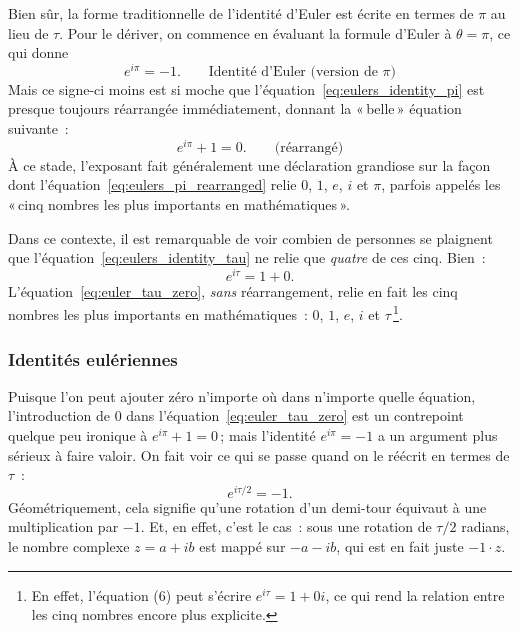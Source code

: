 Bien sûr, la forme traditionnelle de l'identité d'Euler est écrite en termes de $\pi$ au lieu de $\tau$. Pour le dériver, on commence en évaluant la formule d'Euler à $\theta = \pi$, ce qui donne
\begin{equation}
\label{eq:eulers_identity_pi}
e^{i\pi} = -1. \qquad\mbox{Identité d'Euler (version de $\pi$)}
\end{equation}
\noindent Mais ce signe-ci moins est si moche que l'équation~\eqref{eq:eulers_identity_pi} est presque toujours réarrangée immédiatement, donnant la «\,belle\,» équation suivante~:
\begin{equation}
\label{eq:eulers_pi_rearranged}
e^{i\pi} + 1 = 0. \qquad\mbox{(réarrangé)}
\end{equation}
À ce stade, l'exposant fait généralement une déclaration grandiose sur la façon dont l'équation~\eqref{eq:eulers_pi_rearranged} relie $0$, $1$, $e$, $i$ et $\pi$, parfois appelés les «\,cinq nombres les plus importants en mathématiques\,».

Dans ce contexte, il est remarquable de voir combien de personnes se plaignent que l'équation~\eqref{eq:eulers_identity_tau} ne relie que \emph{quatre} de ces cinq. Bien~:
\begin{equation}
\label{eq:euler_tau_zero}
e^{i\tau} = 1 + 0.
\end{equation}
L'équation~\eqref{eq:euler_tau_zero}, \emph{sans} réarrangement, relie en fait les cinq nombres les plus importants en mathématiques~: $0$, $1$, $e$, $i$ et $\tau$\,\footnote{En effet, l'équation (6) peut s'écrire $e^{i\tau} = 1 + 0i$, ce qui rend la relation entre les cinq nombres encore plus explicite.}.

      \subsubsection{Identités eulériennes} %
      \label{sec:eulerian_identities}

Puisque l'on peut ajouter zéro n'importe où dans n'importe quelle équation, l'introduction de $0$ dans l'équation~\eqref{eq:euler_tau_zero} est un contrepoint quelque peu ironique à $e^{i\pi} + 1 = 0$\,; mais l'identité $e^{i\pi} = -1$ a un argument plus sérieux à faire valoir. On fait voir ce qui se passe quand on le réécrit en termes de $\tau$~:
\[
e^{i\tau /2} = -1.
\]
Géométriquement, cela signifie qu'une rotation d'un demi-tour équivaut à une multiplication par $-1$. Et, en effet, c'est le cas~: sous une rotation de $\tau/2$ radians, le nombre complexe $z = a + ib$ est mappé sur $-a - ib$, qui est en fait juste $-1\cdot z$.

